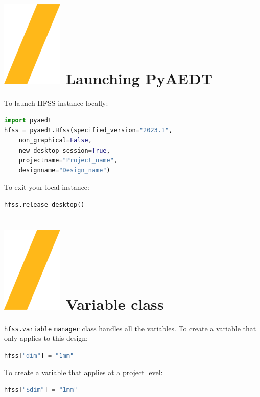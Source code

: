 \documentclass[9pt,landscape]{article}
\begin{document}
\begin{multicols}{3}
\setlength{\premulticols}{1pt}
\setlength{\postmulticols}{1pt}
\setlength{\multicolsep}{1pt}
\setlength{\columnsep}{2pt}

\section{\includegraphics[height=\fontcharht\font`\S]{slash.png} Launching PyAEDT}
To launch HFSS instance locally:
\begin{lstlisting}[language=Python]
import pyaedt
hfss = pyaedt.Hfss(specified_version="2023.1",
	non_graphical=False,
	new_desktop_session=True,
	projectname="Project_name",
	designname="Design_name")
\end{lstlisting}
To exit your local instance:
\begin{lstlisting}[language=Python]
hfss.release_desktop()
\end{lstlisting}
\section{\includegraphics[height=\fontcharht\font`\S]{slash.png} Variable class}
\texttt{hfss.variable$\_$manager} class handles all the variables.
\newline
To create a variable that only applies to this design:
\begin{lstlisting}[language=Python]
hfss["dim"] = "1mm"
\end{lstlisting}
To create a variable that applies at a project level:
\begin{lstlisting}[language=Python]
hfss["$dim"] = "1mm"
\end{lstlisting}

\end{multicols}
\end{document}
